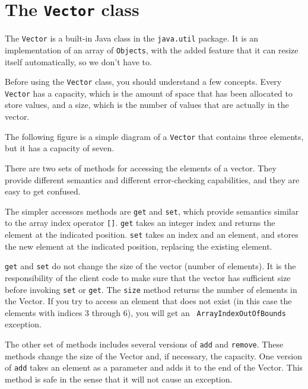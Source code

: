 

\section {The {\tt Vector} class}
\label{vector}

The {\tt Vector} is a built-in Java class in the {\tt java.util}
package.  It is an implementation of an array of {\tt Objects},
with the added feature that it can resize itself automatically,
so we don't have to.

Before using the {\tt Vector} class, you should understand
a few concepts.  Every {\tt Vector} has a
capacity, which is the amount of space that has been allocated
to store values, and a size, which is the number of values that
are actually in the vector.

The following figure is a simple diagram of a {\tt Vector}
that contains three elements, but it has a capacity of seven.


There are two sets of methods for accessing the elements of
a vector.  They provide different semantics and different
error-checking capabilities, and they are easy to get confused.

The simpler accessors methods are {\tt get} and {\tt set}, which
provide semantics similar to the array index operator {\tt []}.
{\tt get} takes an integer index and returns the element at the
indicated position.  {\tt set} takes an index and an element,
and stores the new element at the indicated position, replacing
the existing element.

{\tt get} and {\tt set} do not change the size of the vector (number
of elements).  It is the responsibility of the client code to make
sure that the vector has sufficient size before invoking {\tt set} or
{\tt get}.  The {\tt size} method returns the number of elements in
the Vector.  If you try to access an element that does not exist (in
this case the elements with indices 3 through 6), you will get an {\tt
ArrayIndexOutOfBounds} exception.


The other set of methods includes several versions
of {\tt add} and {\tt remove}.  These methods change the size
of the Vector and, if necessary, the capacity.  One version
of {\tt add} takes an element as a parameter and adds it to the
end of the Vector.  This method is safe in the sense that it
will not cause an exception.

